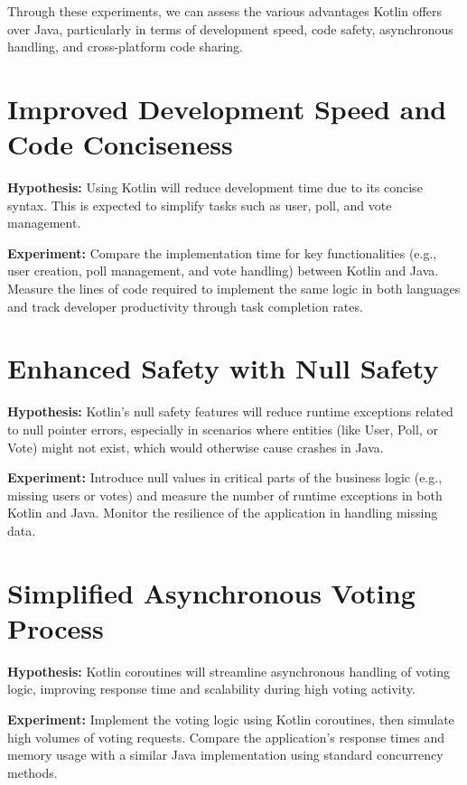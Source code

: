 Through these experiments, we can assess the various advantages Kotlin offers over Java, particularly in terms of development speed, code safety, asynchronous handling, and cross-platform code sharing.


\maketitle

\section*{Improved Development Speed and Code Conciseness}

\textbf{Hypothesis:} Using Kotlin will reduce development time due to its concise syntax. This is expected to simplify tasks such as user, poll, and vote management.

\textbf{Experiment:} Compare the implementation time for key functionalities (e.g., user creation, poll management, and vote handling) between Kotlin and Java. Measure the lines of code required to implement the same logic in both languages and track developer productivity through task completion rates.

\section*{Enhanced Safety with Null Safety}

\textbf{Hypothesis:} Kotlin’s null safety features will reduce runtime exceptions related to null pointer errors, especially in scenarios where entities (like User, Poll, or Vote) might not exist, which would otherwise cause crashes in Java.

\textbf{Experiment:} Introduce null values in critical parts of the business logic (e.g., missing users or votes) and measure the number of runtime exceptions in both Kotlin and Java. Monitor the resilience of the application in handling missing data.

\section*{Simplified Asynchronous Voting Process}

\textbf{Hypothesis:} Kotlin coroutines will streamline asynchronous handling of voting logic, improving response time and scalability during high voting activity.

\textbf{Experiment:} Implement the voting logic using Kotlin coroutines, then simulate high volumes of voting requests. Compare the application’s response times and memory usage with a similar Java implementation using standard concurrency methods.

